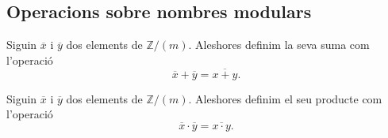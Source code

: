 \documentclass[../../Main.tex]{subfiles}
\begin{document}
	\subsection{Operacions sobre nombres modulars} %
	\begin{definition}
		\label{def:suma de nombres modulars}
		Siguin \(\overline{x}\) i \(\overline{y}\) dos elements de \(\mathbb{Z}/(m)\). Aleshores definim la seva suma com l'operació
		\[\overline{x}+\overline{y}=\overline{x+y}.\]
	\end{definition}
	\begin{definition}
		\label{def:producte de nombres modulars}
		Siguin \(\overline{x}\) i \(\overline{y}\) dos elements de \(\mathbb{Z}/(m)\). Aleshores definim el seu producte com l'operació
		\[\overline{x}\cdot\overline{y}=\overline{x\cdot y}.\]
	\end{definition}
\end{document}
